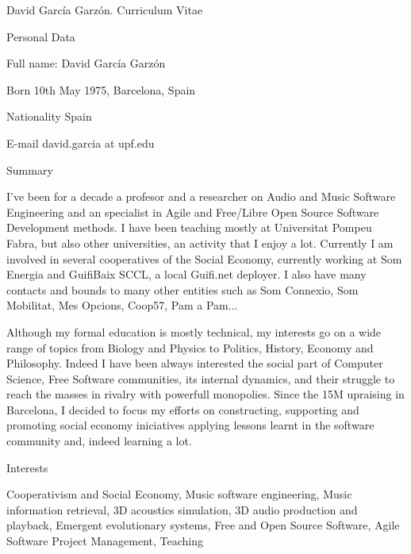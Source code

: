 \documentclass{article}
\begin{document}
\setlength{\cvlabelwidth}{45mm}

\begin{cv}{David García Garzón. Curriculum Vitae}

\begin{cvlist}{Personal Data}
\item[Full name:] David García Garzón
\item[Born] 10th May 1975, Barcelona, Spain
\item[Nationality] Spain
\item[E-mail] david.garcia at upf.edu
\end{cvlist}

\begin{cvlist}{Summary}
\item[] I've been for a decade a profesor and a researcher on Audio and Music Software Engineering
and an specialist in Agile and Free/Libre Open Source Software Development methods.
I have been teaching mostly at Universitat Pompeu Fabra, but also other universities, an activity that I enjoy a lot.
Currently I am involved in several cooperatives of the Social Economy,
currently working at Som Energia and GuifiBaix SCCL,
a local Guifi.net deployer.
I also have many contacts and bounds to many other entities such as
Som Connexio, Som Mobilitat, Mes Opcions, Coop57, Pam a Pam...

Although my formal education is mostly technical, my interests go on a wide range of topics
from Biology and Physics to Politics, History, Economy and Philosophy.
Indeed I have been always interested the social part of Computer Science,
Free Software communities, its internal dynamics, and
their struggle to reach the masses in rivalry with powerfull monopolies.
Since the 15M upraising in Barcelona, I decided to focus my efforts
on constructing, supporting and promoting social economy iniciatives
applying lessons learnt in the software community and, indeed learning a lot.

\end{cvlist}

\begin{cvlist}{Interests}
\item[] Cooperativism and Social Economy, Music software engineering, Music information retrieval, 3D acoustics simulation, 3D audio production and playback, Emergent evolutionary systems, Free and Open Source Software, Agile Software Project Management, Teaching
\end{cvlist}




\end{cv}
\end{document}
